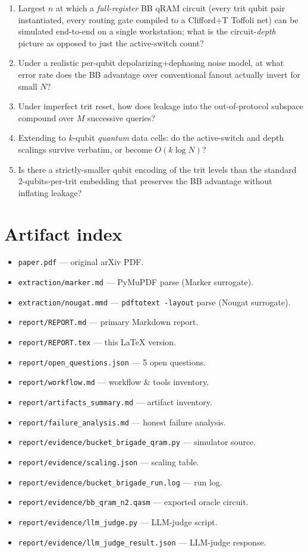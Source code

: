 \documentclass[11pt]{article}
\begin{document}
\begin{enumerate}
  \item[Q1.] Largest $n$ at which a \emph{full-register} BB qRAM circuit
    (every trit qubit pair instantiated, every routing gate compiled to a
    Clifford+T Toffoli net) can be simulated end-to-end on a single
    workstation; what is the circuit-\emph{depth} picture as opposed to just
    the active-switch count?
  \item[Q2.] Under a realistic per-qubit depolarizing+dephasing noise model,
    at what error rate does the BB advantage over conventional fanout
    actually invert for small $N$?
  \item[Q3.] Under imperfect trit reset, how does leakage into the
    out-of-protocol subspace compound over $M$ successive queries?
  \item[Q4.] Extending to $k$-qubit \emph{quantum} data cells: do the
    active-switch and depth scalings survive verbatim, or become $O(k\log N)$?
  \item[Q5.] Is there a strictly-smaller qubit encoding of the trit levels
    than the standard 2-qubits-per-trit embedding that preserves the BB
    advantage without inflating leakage?
\end{enumerate}

\section*{Artifact index}
\begin{itemize}
  \item \texttt{paper.pdf} --- original arXiv PDF.
  \item \texttt{extraction/marker.md} --- PyMuPDF parse (Marker surrogate).
  \item \texttt{extraction/nougat.mmd} --- \texttt{pdftotext -layout} parse (Nougat surrogate).
  \item \texttt{report/REPORT.md} --- primary Markdown report.
  \item \texttt{report/REPORT.tex} --- this LaTeX version.
  \item \texttt{report/open\_questions.json} --- 5 open questions.
  \item \texttt{report/workflow.md} --- workflow \& tools inventory.
  \item \texttt{report/artifacts\_summary.md} --- artifact inventory.
  \item \texttt{report/failure\_analysis.md} --- honest failure analysis.
  \item \texttt{report/evidence/bucket\_brigade\_qram.py} --- simulator source.
  \item \texttt{report/evidence/scaling.json} --- scaling table.
  \item \texttt{report/evidence/bucket\_brigade\_run.log} --- run log.
  \item \texttt{report/evidence/bb\_qram\_n2.qasm} --- exported oracle circuit.
  \item \texttt{report/evidence/llm\_judge.py} --- LLM-judge script.
  \item \texttt{report/evidence/llm\_judge\_result.json} --- LLM-judge response.
\end{itemize}
\end{document}
